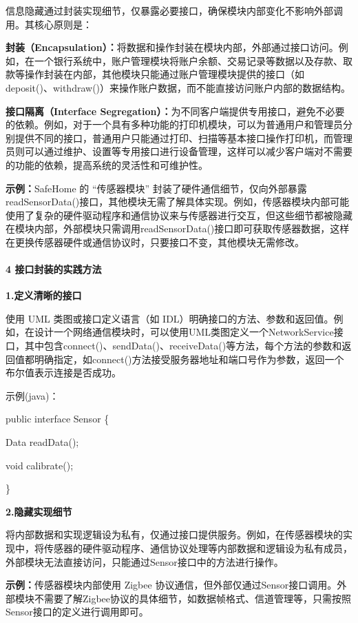 信息隐藏通过封装实现细节，仅暴露必要接口，确保模块内部变化不影响外部调用。其核心原则是：

\textbf{封装（Encapsulation）：}将数据和操作封装在模块内部，外部通过接口访问。例如，在一个银行系统中，账户管理模块将账户余额、交易记录等数据以及存款、取款等操作封装在内部，其他模块只能通过账户管理模块提供的接口（如 deposit()、withdraw()）来操作账户数据，而不能直接访问账户内部的数据结构。

\textbf{接口隔离（Interface Segregation）：}为不同客户端提供专用接口，避免不必要的依赖。例如，对于一个具有多种功能的打印机模块，可以为普通用户和管理员分别提供不同的接口，普通用户只能通过打印、扫描等基本接口操作打印机，而管理员则可以通过维护、设置等专用接口进行设备管理，这样可以减少客户端对不需要的功能的依赖，提高系统的灵活性和可维护性。

\textbf{示例：}SafeHome 的 ``传感器模块'' 封装了硬件通信细节，仅向外部暴露readSensorData()接口，其他模块无需了解具体实现。例如，传感器模块内部可能使用了复杂的硬件驱动程序和通信协议来与传感器进行交互，但这些细节都被隐藏在模块内部，外部模块只需调用readSensorData()接口即可获取传感器数据，这样在更换传感器硬件或通信协议时，只要接口不变，其他模块无需修改。

\paragraph{4 接口封装的实践方法}\label{ux63a5ux53e3ux5c01ux88c5ux7684ux5b9eux8df5ux65b9ux6cd5}

\textbf{1.定义清晰的接口}

使用 UML 类图或接口定义语言（如 IDL）明确接口的方法、参数和返回值。例如，在设计一个网络通信模块时，可以使用UML类图定义一个NetworkService接口，其中包含connect()、sendData()、receiveData()等方法，每个方法的参数和返回值都明确指定，如connect()方法接受服务器地址和端口号作为参数，返回一个布尔值表示连接是否成功。

示例(java)：

public interface Sensor \{

Data readData();

void calibrate();

\}

\textbf{2.隐藏实现细节}

将内部数据和实现逻辑设为私有，仅通过接口提供服务。例如，在传感器模块的实现中，将传感器的硬件驱动程序、通信协议处理等内部数据和逻辑设为私有成员，外部模块无法直接访问，只能通过Sensor接口中的方法进行操作。

\textbf{示例：}传感器模块内部使用 Zigbee 协议通信，但外部仅通过Sensor接口调用。外部模块不需要了解Zigbee协议的具体细节，如数据帧格式、信道管理等，只需按照Sensor接口的定义进行调用即可。

